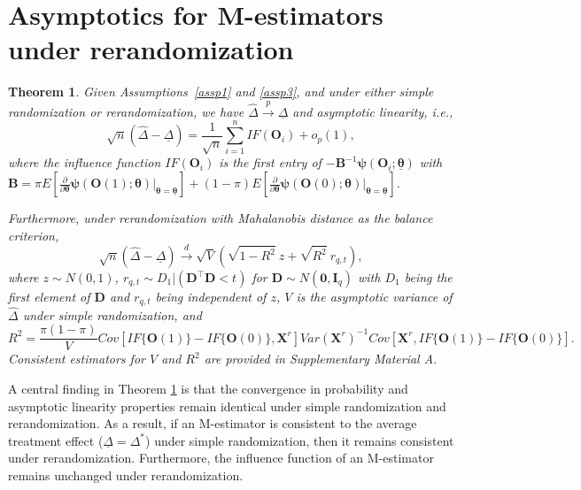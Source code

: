 \documentclass[12pt]{article}
\newtheorem{theorem}{Theorem}
\newcommand{\bX}{\boldsymbol{X}}\newcommand{\bO}{\boldsymbol{O}}
\newcommand{\bD}{\boldsymbol{D}}
\newcommand{\bzero}{\boldsymbol{0}}
\newcommand{\btheta}{\boldsymbol{\theta}}
\newcommand{\bpsi}{\boldsymbol{\psi}}
\newcommand{\bfB}{\mathbf{B}}
\begin{document}
\section{Asymptotics for M-estimators under rerandomization}\label{sec: main}
\begin{theorem}\label{thm1}
    Given Assumptions~\ref{assp1} and \ref{assp3}, and under either simple randomization or rerandomization, we have $\widehat{\Delta} \xrightarrow{p} \underline{\Delta}$ and asymptotic linearity, i.e., 
    \begin{equation}
    \sqrt{n}(\widehat{\Delta} - \underline{\Delta}) = \frac{1}{\sqrt{n}}\sum_{i=1}^nIF(\bO_i) + o_p(1), \label{asymptoticlinearity}
    \end{equation} 
	where the influence function $IF(\bO_i)$ is the first entry of $-\bfB^{-1}\bpsi(\bO_i;\underline{\btheta})$ with\\ $\bfB = \pi E\left[\frac{\partial}{\partial \btheta} \bpsi(\bO(1);\btheta)\big|_{\btheta=\underline{\btheta}}\right] + (1-\pi)E\left[\frac{\partial}{\partial \btheta} \bpsi(\bO(0);\btheta)\big|_{\btheta=\underline{\btheta}}\right]$.

 Furthermore, under rerandomization with Mahalanobis distance as the balance criterion,
 \begin{equation}\label{eq: asymptotic distribution}
     \sqrt{n}(\widehat{\Delta} - \underline\Delta) \xrightarrow{d} \sqrt{V}\left(\sqrt{1-R^2}\ z + \sqrt{R^2}\ r_{q,t}\right),
 \end{equation}
where $z \sim N(0,1)$, $r_{q,t} \sim D_1|( \bD^\top  \bD < t)$ for $\bD \sim N(\bzero, \mathbf{I}_q)$ with $D_1$ being the first element of $\bD$ and $r_{q,t}$ being independent of $z$, $V$ is the asymptotic variance of $\widehat{\Delta}$ under simple randomization, and
\begin{equation*}
    R^2 = \frac{\pi(1-\pi)}{V} Cov[IF\{\bO(1)\}- IF\{\bO(0)\}, \bX^r]Var(\bX^r)^{-1}Cov[\bX^r, IF\{\bO(1)\}- IF\{\bO(0)\}].
\end{equation*}
Consistent estimators for $V$ and $R^2$ are provided in Supplementary Material A.
\end{theorem}

A central finding in Theorem \ref{thm1} is that the convergence in probability and asymptotic linearity properties remain identical under simple randomization and rerandomization. 
As a result, if an M-estimator is consistent to the average treatment effect ($\underline{\Delta} = \Delta^*$) under simple randomization, then it remains consistent under rerandomization. Furthermore, the influence function of an M-estimator remains unchanged under rerandomization.
\end{document}
